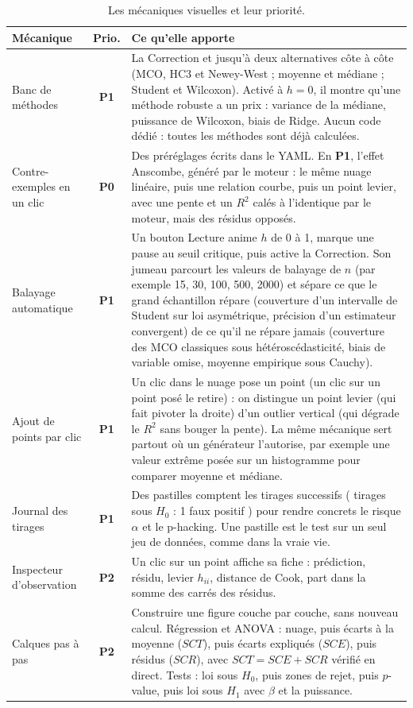 \documentclass[11pt,a4paper]{article}
\newcommand{\pzero}{\colorbox{ctCorrection!18}{\footnotesize\textbf{P0}}}
\newcommand{\pone}{\colorbox{ctMethod!18}{\footnotesize\textbf{P1}}}
\newcommand{\ptwo}{\colorbox{ctBaseline!18}{\footnotesize\textbf{P2}}}
\begin{document}
\begin{table}[H]
  \centering
  \small
  \begin{tabularx}{\textwidth}{@{}L{3.9cm} c Y@{}}
    \toprule
    \textbf{Mécanique} & \textbf{Prio.} & \textbf{Ce qu'elle apporte} \\
    \midrule
    Banc de méthodes & \pone & La Correction et jusqu'à deux alternatives côte à côte (MCO, HC3 et Newey-West ; moyenne et médiane ; Student et Wilcoxon). Activé à $h=0$, il montre qu'une méthode robuste a un prix : variance de la médiane, puissance de Wilcoxon, biais de Ridge. Aucun code dédié : toutes les méthodes sont déjà calculées. \\
    Contre-exemples en un clic & \pzero & Des préréglages écrits dans le YAML. En \pone{}, l'effet Anscombe, généré par le moteur : le même nuage linéaire, puis une relation courbe, puis un point levier, avec une pente et un $R^2$ calés à l'identique par le moteur, mais des résidus opposés. \\
    Balayage automatique & \pone & Un bouton Lecture anime $h$ de 0 à 1, marque une pause au seuil critique, puis active la Correction. Son jumeau parcourt les valeurs de balayage de $n$ (par exemple 15, 30, 100, 500, 2000) et sépare ce que le grand échantillon répare (couverture d'un intervalle de Student sur loi asymétrique, précision d'un estimateur convergent) de ce qu'il ne répare jamais (couverture des MCO classiques sous hétéroscédasticité, biais de variable omise, moyenne empirique sous Cauchy). \\
    Ajout de points par clic & \pone & Un clic dans le nuage pose un point (un clic sur un point posé le retire) : on distingue un point levier (qui fait pivoter la droite) d'un outlier vertical (qui dégrade le $R^2$ sans bouger la pente). La même mécanique sert partout où un générateur l'autorise, par exemple une valeur extrême posée sur un histogramme pour comparer moyenne et médiane. \\
    Journal des tirages & \pone & Des pastilles comptent les tirages successifs ( tirages sous $H_0$ : 1 faux positif \fg{}) pour rendre concrets le risque $\alpha$ et le p-hacking. Une pastille est le test sur un seul jeu de données, comme dans la vraie vie. \\
    Inspecteur d'observation & \ptwo & Un clic sur un point affiche sa fiche : prédiction, résidu, levier $h_{ii}$, distance de Cook, part dans la somme des carrés des résidus. \\
    Calques pas à pas & \ptwo & Construire une figure couche par couche, sans nouveau calcul. Régression et ANOVA : nuage, puis écarts à la moyenne ($SCT$), puis écarts expliqués ($SCE$), puis résidus ($SCR$), avec $SCT = SCE + SCR$ vérifié en direct. Tests : loi sous $H_0$, puis zones de rejet, puis $p$-value, puis loi sous $H_1$ avec $\beta$ et la puissance. \\
    \bottomrule
  \end{tabularx}
  \caption{Les mécaniques visuelles et leur priorité.}
\end{table}
\end{document}
